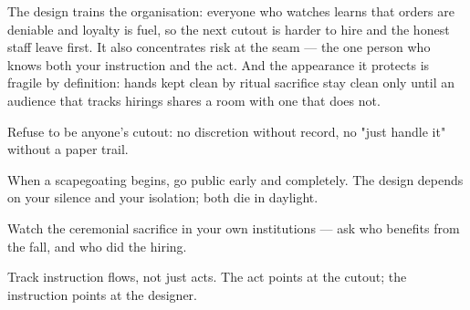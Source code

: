 \begin{failure}
The design trains the organisation: everyone who watches learns that orders are deniable and loyalty is fuel, so the next cutout is harder to hire and the honest staff leave first. It also concentrates risk at the seam --- the one person who knows both your instruction and the act. And the appearance it protects is fragile by definition: hands kept clean by ritual sacrifice stay clean only until an audience that tracks hirings shares a room with one that does not.
\end{failure}
\begin{countermeasures}
  \item Refuse to be anyone's cutout: no discretion without record, no "just handle it" without a paper trail.
  \item When a scapegoating begins, go public early and completely. The design depends on your silence and your isolation; both die in daylight.
  \item Watch the ceremonial sacrifice in your own institutions --- ask who benefits from the fall, and who did the hiring.
  \item Track instruction flows, not just acts. The act points at the cutout; the instruction points at the designer.
\end{countermeasures}

\seesources
{}
